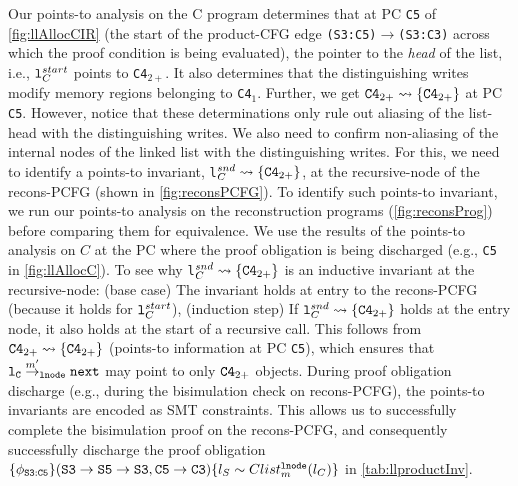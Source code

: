 Our points-to analysis on
the C program determines that at PC {\tt C5} of \cref{fig:llAllocCIR} (the start of
the product-CFG edge {\tt (S3:C5)$\rightarrow$(S3:C3)} across which the proof
condition is being evaluated),
the pointer to the {\em head}
of the list, i.e., ${\tt l}^{start}_C$
points to {\tt C4}$_{2+}$. It also determines that the distinguishing
writes modify memory regions belonging to {\tt C4}$_1$. 
Further, we get ${\tt C4}_{2+}\rightsquigarrow{}\{{\tt C4}_{2+}\}$ at PC {\tt C5}.
However,
notice that these determinations only rule out aliasing of the list-head with
the distinguishing writes. We also need to confirm non-aliasing
of the internal nodes of the linked list with the distinguishing
writes.
For this, we need to identify a points-to invariant,
{\tt l}$_C^{snd}\rightsquigarrow{}\{{\tt C4}_{2+}\}$, at the recursive-node
of the recons-PCFG
(shown in \cref{fig:reconsPCFG}).
To identify such points-to invariant, we run our points-to analysis
on the reconstruction programs (\cref{fig:reconsProg}) before comparing them for equivalence.
We use the results of the points-to analysis on $C$ at the PC where the proof obligation
is being discharged (e.g., {\tt C5} in \cref{fig:llAllocC}).
To see why {\tt l}$_C^{snd}\rightsquigarrow{}\{{\tt C4}_{2+}\}$ is
an inductive invariant at the recursive-node:
(base case) The invariant holds
at entry to the recons-PCFG (because it holds for ${\tt l}^{start}_C$),
(induction step) If ${\tt l}_C^{snd}\rightsquigarrow{}\{{\tt C4}_{2+}\}$
holds at the entry node,
it also holds at the start of a recursive call. This
follows from ${\tt C4}_{2+}\rightsquigarrow{}\{{\tt C4}_{2+}\}$ (points-to information at PC {\tt C5}),
which ensures that ${\tt \tt l_C} \overset{m'}{\rightarrow}_{\tt lnode} {\tt next}$ may point to only ${\tt C4}_{2+}$ objects.
During proof obligation discharge (e.g., during the bisimulation
check on recons-PCFG), the points-to invariants are encoded as SMT constraints.
This allows us to successfully
complete the bisimulation proof on the recons-PCFG, and
consequently successfully discharge the
proof obligation
$\{\phi_{{\tt S3:C5}}\}\\({\tt S3\rightarrow S5\rightarrow S3}, {\tt C5\rightarrow C3}) \{l_{S}\sim{}Clist^{{\tt lnode}}_{m}(l_{C})\}$ in \cref{tab:llproductInv}.
\vspace{-3px}

